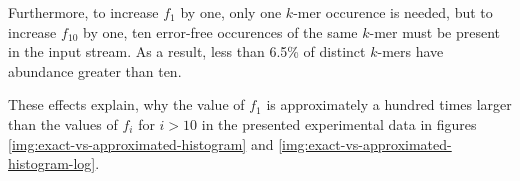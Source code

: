 Furthermore, to increase $f_1$ by one, only one $k$-mer occurence is needed, but to increase
$f_{10}$ by one, ten error-free occurences of the same $k$-mer must be present in the input stream. 
As a result, less than 6.5\% of distinct $k$-mers have abundance greater than ten.

These effects explain, why the value of $f_1$ is approximately a hundred times larger than
the values of $f_i$ for $i>10$ in the presented experimental data in figures
\ref{img:exact-vs-approximated-histogram} and \ref{img:exact-vs-approximated-histogram-log}.
